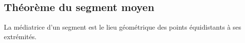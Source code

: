 \documentclass[a4paper,12pt]{article}
\begin{document}
\subsection{Théorème du segment moyen}
\begin{theorem}
La médiatrice d'un segment est le lieu géométrique des points équidistants à ses extrémités.
\end{theorem}
\end{document}
